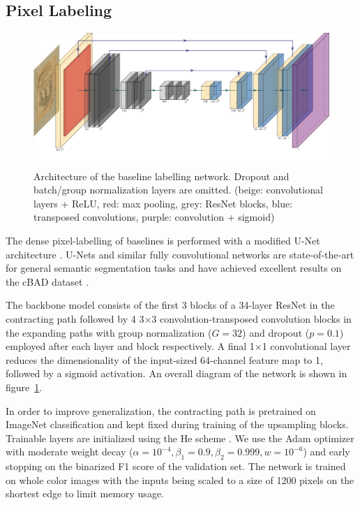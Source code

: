\subsection{Pixel Labeling}

\begin{figure}
	\centering
	\includegraphics[width=\textwidth]{diag}
	\caption{Architecture of the baseline labelling network. Dropout and
	batch/group normalization layers are omitted. (beige: convolutional layers +
	ReLU, red: max pooling, grey: ResNet blocks, blue: transposed
	convolutions, purple: convolution + sigmoid)}
	\label{fig:resunet}
\end{figure}

The dense pixel-labelling of baselines is performed with a modified U-Net
architecture \cite{ronneberger2015u}. U-Nets and similar fully convolutional
networks \cite{long2015fully} are state-of-the-art for general semantic
segmentation tasks and have achieved excellent results on the cBAD dataset
\cite{diem2017cbad}.

The backbone model consists of the first 3 blocks of a 34-layer ResNet in the
contracting path followed by 4 3$\times$3 convolution-transposed convolution
blocks in the expanding paths with group normalization
\cite{DBLP:journals/corr/abs-1803-08494} ($G = 32$) and dropout ($p = 0.1$)
employed after each layer and block respectively. A final 1$\times$1
convolutional layer reduces the dimensionality of the input-sized 64-channel
feature map to 1, followed by a sigmoid activation. An overall diagram of the
network is shown in figure~\ref{fig:resunet}.

In order to improve generalization, the contracting path is pretrained on
ImageNet classification and kept fixed during training of the upsampling
blocks. Trainable layers are initialized using the He scheme
\cite{he2015delving}. We use the Adam optimizer with moderate weight decay
($\alpha = 10^{-4}, \beta_1 = 0.9, \beta_2 = 0.999, w = 10^{-6}$) and early
stopping on the binarized F1 score of the validation set.  The network is
trained on whole color images with the inputs being scaled to a size of 1200
pixels on the shortest edge to limit memory usage.

